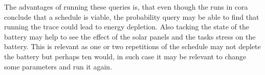 The advantages of running these queries is, that even though the runs in \gls{cora} conclude that a schedule is viable, the probability query may be able to find that running the trace could lead to energy depletion. Also tacking the state of the battery may help to see the effect of the solar panels and the tasks stress on the battery. This is relevant as one or two repetitions of the schedule may not deplete the battery but perhaps ten would, in such case it may be relevant to change some parameters and run it again.
